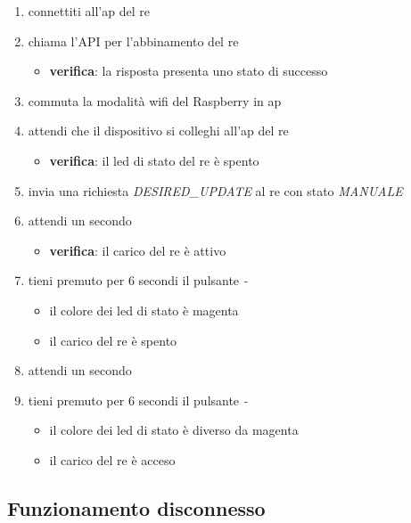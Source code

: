 \documentclass[12pt,a4paper,twoside,titlepage]{book}
\begin{document}
\begin{enumerate}
    \item connettiti all'\acrshort{ap} del \acrshort{re}
    \item chiama l'API per l'abbinamento del \acrshort{re} 
    \begin{itemize}
        \item \textbf{verifica}: la risposta presenta uno stato di successo 
    \end{itemize}
    \item commuta la modalità \Gls{wifi} del Raspberry in \acrshort{ap}
    \item attendi che il dispositivo si colleghi all'\acrshort{ap} del \acrshort{re}
    \begin{itemize}
        \item \textbf{verifica}: il  \acrshort{led} di stato del \acrshort{re} è spento 
    \end{itemize}
    \item invia una richiesta \textit{DESIRED\_UPDATE} al \acrshort{re} con stato \textit{MANUALE}
    \item attendi un secondo 
    \begin{itemize}
        \item \textbf{verifica}: il carico del \acrshort{re} è attivo 
    \end{itemize}
    \item tieni premuto per 6 secondi il pulsante \textit{-}
    \begin{itemize}
        \item il colore dei led di stato è magenta
        \item il carico del \acrshort{re} è spento 
    \end{itemize}
    \item attendi un secondo 
    \item tieni premuto per 6 secondi il pulsante \textit{-}
    \begin{itemize}
        \item il colore dei led di stato è diverso da magenta 
        \item il carico del \acrshort{re} è acceso
    \end{itemize}
\end{enumerate}

\subsection{Funzionamento disconnesso}
\label{section:test_offline_working}
\end{document}

